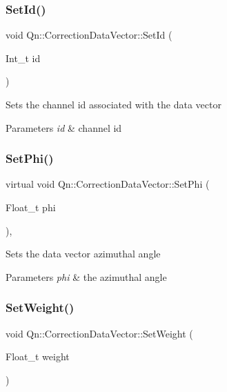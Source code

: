 \subsubsection{\texorpdfstring{Set\+Id()}{SetId()}}
{\footnotesize\ttfamily void Qn\+::\+Correction\+Data\+Vector\+::\+Set\+Id (\begin{DoxyParamCaption}\item[{Int\+\_\+t}]{id }\end{DoxyParamCaption})\hspace{0.3cm}{\ttfamily [inline]}}

Sets the channel id associated with the data vector 
\begin{DoxyParams}{Parameters}
{\em id} & channel id \\
\hline
\end{DoxyParams}
\mbox{\label{classQn_1_1CorrectionDataVector_aa2d415fd11a858c3c32c3fd820889bdc}} 
\subsubsection{\texorpdfstring{Set\+Phi()}{SetPhi()}}
{\footnotesize\ttfamily virtual void Qn\+::\+Correction\+Data\+Vector\+::\+Set\+Phi (\begin{DoxyParamCaption}\item[{Float\+\_\+t}]{phi }\end{DoxyParamCaption})\hspace{0.3cm}{\ttfamily [inline]}, {\ttfamily [virtual]}}

Sets the data vector azimuthal angle 
\begin{DoxyParams}{Parameters}
{\em phi} & the azimuthal angle \\
\hline
\end{DoxyParams}
\mbox{\label{classQn_1_1CorrectionDataVector_a4d71cb8911dd32d76ebc67250c24bac6}} 
\subsubsection{\texorpdfstring{Set\+Weight()}{SetWeight()}}
{\footnotesize\ttfamily void Qn\+::\+Correction\+Data\+Vector\+::\+Set\+Weight (\begin{DoxyParamCaption}\item[{Float\+\_\+t}]{weight }\end{DoxyParamCaption})\hspace{0.3cm}{\ttfamily [inline]}}

